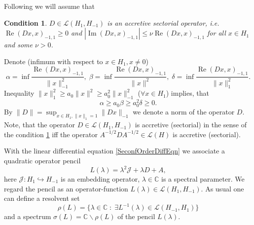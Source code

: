\documentclass[12pt, reqno]{amsart}
\theoremstyle{plain}
\newtheorem{condition}{Condition}
\begin{document}
Following \cite{JacobTrunk09} we will assume that
\begin{condition}\label{ConditionD}
$D\in{{\mathcal{L} }}(H_1,H_{-1})$ is an accretive sectorial operator, i.e. ${\operatorname{Re}}(Dx,x)_{-1,1}\geq0$ and 
$|{\operatorname{Im}}(Dx,x)_{-1,1}|\leq\nu {\operatorname{Re}}(Dx,x)_{-1,1}$ for all $x\in H_1$  and some $\nu>0$.
\end{condition}
Denote (infimum with respect to $x\in H_1,x\ne0$)
 \[
    \alpha=\inf\frac{{\operatorname{Re}}(Dx,x)_{-1,1}}{\|x\|^2_{-1}},\;
    \beta=\inf\frac{{\operatorname{Re}}(Dx,x)_{-1,1}}{\|x\|^2},\;
    \delta=\inf\frac{{\operatorname{Re}}(Dx,x)_{-1,1}}{\|x\|^2_{1}}.
 \]
Inequality $\|x\|^2_1\geq a_0\|x\|^2\geq a_0^2\|x\|^2_{-1}$ ($\forall x\in H_1$)  implies, that $$\alpha\geq a_0\beta\geq a_0^2\delta\geq0.$$
By $\|D\|=\sup_{x\in H_1,\|x\|_1=1}\|Dx\|_{-1}$ we denote a norm of the operator  $D$. Note, that the operator $D\in{{\mathcal{L} }}(H_1,H_{-1})$ 
is accretive (sectorial) in the sense of the condition \ref{ConditionD} iff the operator $A^{-1/2}DA^{-1/2}\in{{\mathcal{L} }}(H)$ 
is accretive (sectorial). 

With the linear differential equation \eqref{SeconfOrderDiffEqn} we associate a quadratic operator
pencil \cite{HrynivShkalikov04,JacobTrunk09}
 \[
    L(\lambda)=\lambda^2 {{\mathcal J}}+\lambda D+A,
 \]
here ${{\mathcal J}}:H_1\hookrightarrow H_{-1}$ is an embedding operator, $\lambda\in{{\mathbb C}}$ is a spectral parameter.
We regard the pencil as an operator-function $L(\lambda)\in{{\mathcal{L} }}(H_1,H_{-1})$. As usual  one can define a resolvent set
  \[
     \rho(L)=\{\lambda\in{{\mathbb C}}\;:\;\exists L^{-1}(\lambda)\in{{\mathcal{L} }}(H_{-1},H_1)\}
  \]
and a spectrum $\sigma(L)={{\mathbb C}}\backslash\rho(L)$ of the pencil $L(\lambda)$.
\end{document}
